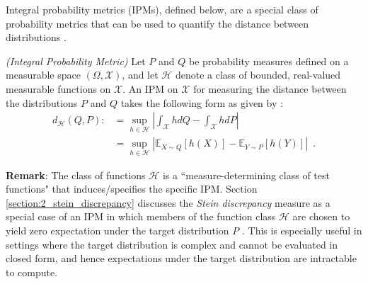 Integral probability metrics (IPMs), defined below, are a special class of probability metrics that can be used to quantify the distance between distributions \citep[e.g.,][]{muller_ipm}. 
\renewcommand{\thetheorem}{2.3}
\begin{definition}
\label{defn:ipm}
\emph{(Integral Probability Metric)}\newline
Let $P$ and $Q$ be probability measures defined on a measurable space $(\Omega, \mathcal{X})$, and let $\mathcal{H}$ denote a class of bounded, real-valued measurable functions on $\mathcal{X}$. An IPM on $\mathcal{X}$ for measuring the distance between the distributions $P$ and $Q$ takes the following form as given by \citet{gretton_ipm}:
\begin{align}
d_{\mathcal{H}}(Q, P) :&= \underset{h \in \mathcal{H}}{\sup} \left|\int_{\mathcal{X}}hdQ - \int_{\mathcal{X}}hdP \right| \\ &= \underset{h \in \mathcal{H}}{\sup}\left|\mathbb{E}_{X \sim Q}\left[h(X)\right] - \mathbb{E}_{Y \sim P}\left[h(Y)\right] \right| \label{eqn:ipm} \enspace.
\end{align}
\end{definition}

\textbf{Remark}: The class of functions $\mathcal{H}$ is a ``measure-determining class of test functions" \citep{anastasiou_stein} that induces/specifies the specific IPM. Section \ref{section:2_stein_discrepancy} discusses the \textit{Stein discrepancy} measure as a special case of an IPM \citep{gong_sliced_ksd} in which members of the function class $\mathcal{H}$ are chosen to yield zero expectation under the target distribution $P$ \citep{hu_stein_neural_sampler, gorham_stochastic_sd}. This is especially useful in settings where the target distribution is complex and cannot be evaluated in closed form, and hence expectations under the target distribution are intractable to compute.



